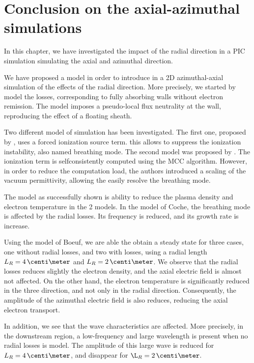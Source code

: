 
\section{Conclusion on the axial-azimuthal simulations}

In this chapter, we have investigated the impact of the radial direction in a \ac{PIC} simulation simulating the axial and azimuthal direction.

We have proposed a model in order to introduce in a \ac{2D} azimuthal-axial simulation of the effects of the radial direction.
More precisely, we started by model the losses, corresponding to fully absorbing walls without electron remission.
The model imposes a pseudo-local flux neutrality at the wall, reproducing the effect of a floating sheath.

Two different model of simulation has been investigated. The first one, proposed by \citet{boeuf2018}, uses a forced ionization source term. this allows to suppress the ionization instability, also named breathing mode.
The second model was proposed by \citet{coche2014}. 
The ionization term is selfconsistently computed using the \ac{MCC} algorithm.
However, in order to reduce the computation load, the authors introduced a scaling of the vacuum permittivity, allowing the easily resolve the breathing mode.

\vspace{1em}
The model as successfully shown is ability to reduce the plasma density and electron temperature in the 2 models.
In the model of Coche, the breathing mode is affected by the radial losses. 
Its frequency is reduced, and its growth rate is increase.

Using the model of Boeuf, we are able the obtain a steady state for three cases, one without radial losses, and two with losses, using a radial length $L_R=4\,\centi\meter$ and $L_R=2\,\centi\meter$.
We observe that the radial losses reduces slightly the electron density, and the axial electric field is almost not affected.
On the other hand, the electron temperature is significantly reduced in the three direction, and not only in the radial direction.
Consequently, the amplitude of the azimuthal electric field is also reduces, reducing the axial electron transport.

In addition, we see that the wave characteristics are affected.
More precisely, in the downstream region, a low-frequency and large wavelength is present when no radial losses is model.
The amplitude of this large wave is reduced for $L_R=4\,\centi\meter$, and disappear for $\L_R=2\,\centi\meter$.

